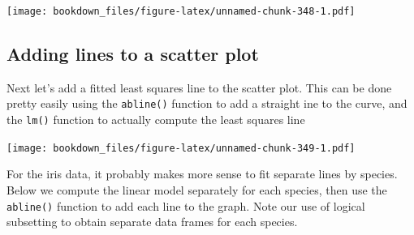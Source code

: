 \documentclass[]{krantz}
\makeatletter
\newenvironment{Shaded}{\begin{snugshade}}{\end{snugshade}}
\newcommand{\KeywordTok}[1]{\textcolor[rgb]{0.27,0.27,0.27}{\textbf{#1}}}
\newcommand{\DataTypeTok}[1]{\textcolor[rgb]{0.27,0.27,0.27}{#1}}
\newcommand{\DecValTok}[1]{\textcolor[rgb]{0.06,0.06,0.06}{#1}}
\newcommand{\FloatTok}[1]{\textcolor[rgb]{0.06,0.06,0.06}{#1}}
\newcommand{\StringTok}[1]{\textcolor[rgb]{0.5,0.5,0.5}{#1}}
\newcommand{\OperatorTok}[1]{\textcolor[rgb]{0.43,0.43,0.43}{\textbf{#1}}}
\newcommand{\NormalTok}[1]{#1}
\newenvironment{kframe}{%
\medskip{}
\setlength{\fboxsep}{.8em}
 \def\at@end@of@kframe{}%
 \ifinner\ifhmode%
  \def\at@end@of@kframe{\end{minipage}}%
  \begin{minipage}{\columnwidth}%
 \fi\fi%
 \def\FrameCommand##1{\hskip\@totalleftmargin \hskip-\fboxsep
 \colorbox{shadecolor}{##1}\hskip-\fboxsep
     \hskip-\linewidth \hskip-\@totalleftmargin \hskip\columnwidth}%
 \MakeFramed {\advance\hsize-\width
   \@totalleftmargin\z@ \linewidth\hsize
   \@setminipage}}%
 {\par\unskip\endMakeFramed%
 \at@end@of@kframe}
\renewenvironment{Shaded}{\begin{kframe}}{\end{kframe}}
\makeatother
\begin{document}
\texttt{[image: bookdown\_files/figure-latex/unnamed-chunk-348-1.pdf]}

\subsection{Adding lines to a scatter
plot}\label{adding-lines-to-a-scatter-plot-1}

Next let's add a fitted least squares line to the scatter plot. This can
be done pretty easily using the \texttt{abline()} function to add a
straight ine to the curve, and the \texttt{lm()} function to actually
compute the least squares line

\begin{Shaded}
\end{Shaded}

\texttt{[image: bookdown\_files/figure-latex/unnamed-chunk-349-1.pdf]}

For the iris data, it probably makes more sense to fit separate lines by
species. Below we compute the linear model separately for each species,
then use the \texttt{abline()} function to add each line to the graph.
Note our use of logical subsetting to obtain separate data frames for
each species.
\end{document}
